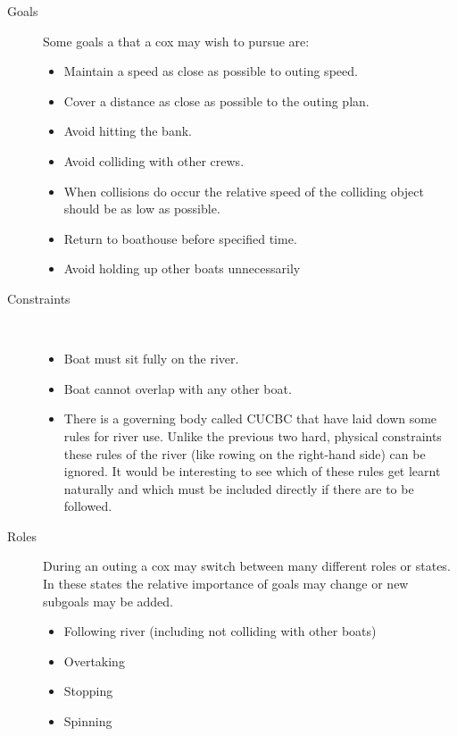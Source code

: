 \begin{description}
  \item[Goals]
    Some goals a that a cox may wish to pursue are:
    \begin{itemize}
      \item Maintain a speed as close as possible to outing speed.
      \item Cover a distance as close as possible to the outing plan.
      \item Avoid hitting the bank.
      \item Avoid colliding with other crews.
      \item When collisions do occur the relative speed of the colliding object should be as low as possible.
      \item Return to boathouse before specified time.
      \item Avoid holding up other boats unnecessarily
    \end{itemize}
    
  \item[Constraints]\\
    \begin{itemize}
      \item Boat must sit fully on the river.
      \item Boat cannot overlap with any other boat.
      \item There is a governing body called CUCBC that have laid down some rules for river use. Unlike the previous two hard, physical constraints these rules of the river (like rowing on the right-hand side) can be ignored. It would be interesting to see which of these rules get learnt naturally and which must be included directly if there are to be followed.
    \end{itemize}
    
  \item[Roles]
    During an outing a cox may switch between many different roles or states. In these states the relative importance of goals may change or new subgoals may be added.
    \begin{itemize}
      \item Following river (including not colliding with other boats)
      \item Overtaking
      \item Stopping
      \item Spinning
    \end{itemize}
  \end{description}
  
